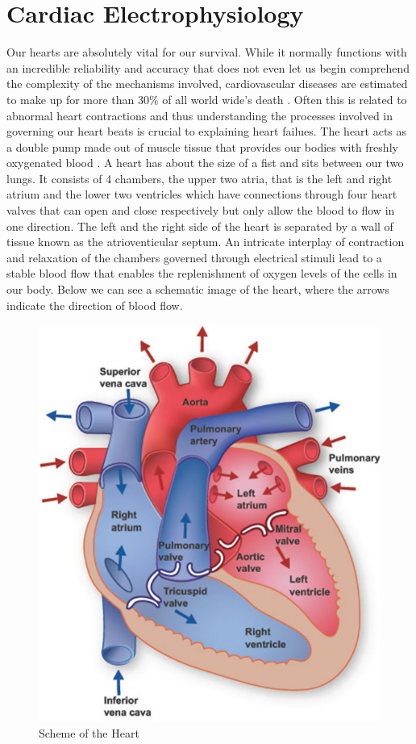 \documentclass[../draft_1.tex]{subfiles}
\begin{document}
\chapter{Cardiac Electrophysiology}

Our hearts are absolutely vital for our survival. While it normally functions with an incredible reliability and accuracy that does not even let us begin comprehend the complexity of the mechanisms involved, cardiovascular diseases are estimated to make up for more than 30\% of all world wide's death \cite{WHO_statistics}. Often this is related to abnormal heart contractions and thus understanding the processes involved in governing our heart beats is crucial to explaining heart failues. The heart acts as a double pump made out of muscle tissue that provides our bodies with freshly oxygenated blood \cite{deMotuCordis}. A heart has about the size of a fist and sits between our two lungs. It consists of 4 chambers, the upper two atria, that is the left and right atrium and the lower two ventricles which have connections through four heart valves that can open and close respectively but only allow the blood to flow in one direction. The left and the right side of the heart is separated by a wall of tissue known as the atrioventicular septum. An intricate interplay of contraction and relaxation of the chambers governed through electrical stimuli lead to a stable blood flow that enables the replenishment of oxygen levels of the cells in our body. Below we can see a schematic image of the heart, where the arrows indicate the direction of blood flow.

\begin{figure}[ht!]
	\centering
	\includegraphics[scale=0.3]{images/electrophysiology/heart_structure}
	\caption{Scheme of the Heart \cite{franzone2014mathematical}}
\end{figure}
\end{document}
